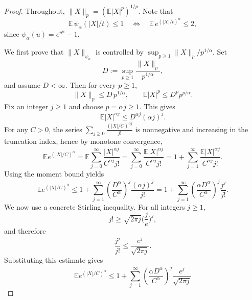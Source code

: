 \documentclass[12pt]{article}
\renewcommand{\(}{\left(}%
\renewcommand{\)}{\right)}%
\renewcommand{\[}{\left[}%
\renewcommand{\]}{\right]}%
\newtheorem{proof}{Proof.}}
\begin{document}
\begin{proof}
Throughout, $\|X\|_p=(\mathbb{E}|X|^p)^{1/p}$. Note that
\begin{equation*}
\mathbb{E}\,\psi_\alpha(|X|/t)\le 1
\quad\Longleftrightarrow\quad
\mathbb{E}\,e^{(|X|/t)^\alpha}\le 2,
\end{equation*}
since $\psi_\alpha(u)=e^{u^\alpha}-1$.

\medskip
We first prove that $\|X\|_{\psi_\alpha}$ is controlled by $\sup_{p\ge 1}\|X\|_p/p^{1/\alpha}$. Set
\begin{equation*}
D:=\sup_{p\ge 1}\frac{\|X\|_p}{p^{1/\alpha}},
\end{equation*}
and assume $D<\infty$. Then for every $p\ge 1$,
\begin{equation*}
\|X\|_p\le D\,p^{1/\alpha},
\qquad
\mathbb{E}|X|^p\le D^p p^{p/\alpha}.
\end{equation*}
Fix an integer $j\ge 1$ and choose $p=\alpha j\ge 1$. This gives
\begin{equation*}
\mathbb{E}|X|^{\alpha j}\le D^{\alpha j}(\alpha j)^j.
\end{equation*}
For any $C>0$, the series $\sum_{j\ge 0}\frac{(|X|/C)^{\alpha j}}{j!}$ is nonnegative and increasing in the truncation index, hence by monotone convergence,
\begin{equation*}
\mathbb{E}e^{(|X|/C)^\alpha}
=\mathbb{E}\sum_{j=0}^\infty \frac{|X|^{\alpha j}}{C^{\alpha j}j!}
=\sum_{j=0}^\infty \frac{\mathbb{E}|X|^{\alpha j}}{C^{\alpha j}j!}
=1+\sum_{j=1}^\infty \frac{\mathbb{E}|X|^{\alpha j}}{C^{\alpha j}j!}.
\end{equation*}
Using the moment bound yields
\begin{equation*}
\mathbb{E}e^{(|X|/C)^\alpha}
\le 1+\sum_{j=1}^\infty \left(\frac{D^\alpha}{C^\alpha}\right)^j\frac{(\alpha j)^j}{j!}
=1+\sum_{j=1}^\infty \left(\frac{\alpha D^\alpha}{C^\alpha}\right)^j\frac{j^j}{j!}.
\end{equation*}
We now use a concrete Stirling inequality. For all integers $j\ge 1$,
\begin{equation*}
j!\ge \sqrt{2\pi j}\Big(\frac{j}{e}\Big)^j,
\end{equation*}
and therefore
\begin{equation*}
\frac{j^j}{j!}\le \frac{e^j}{\sqrt{2\pi j}}.
\end{equation*}
Substituting this estimate gives
\begin{equation*}
\mathbb{E}e^{(|X|/C)^\alpha}
\le 1+\sum_{j=1}^\infty \left(\frac{\alpha D^\alpha}{C^\alpha}\right)^j\frac{e^j}{\sqrt{2\pi j}}

\end{equation*}
\end{proof}
\end{document}
